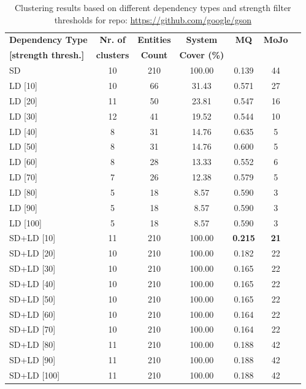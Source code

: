 \documentclass{ieeeaccess}
\begin{document}
\begin{table}
\caption{Clustering results based on different dependency types and strength filter thresholds for repo: \href{https://github.com/google/gson}{https://github.com/google/gson}}
\label{tab:clustering_results_gson}
\centering
\setlength{\tabcolsep}{3pt}
\begin{tabular}{|l|c|c|c|c|c|c|}
\hline
\textbf{Dependency Type} & \textbf{Nr. of} & \textbf{Entities} & \textbf{System} & \textbf{MQ} & \textbf{MoJo} \\
\textbf{[strength thresh.]} & \textbf{clusters} & \textbf{Count} & \textbf{Cover (\%)} &  &  \\
\hline
SD & 10 & 210 & 100.00 & 0.139 & 44 \\
\hline
LD [10] & 10 & 66 & 31.43 & 0.571 & 27 \\
LD [20] & 11 & 50 & 23.81 & 0.547 & 16 \\
LD [30] & 12 & 41 & 19.52 & 0.544 & 10 \\
LD [40] & 8 & 31 & 14.76 & 0.635 & 5 \\
LD [50] & 8 & 31 & 14.76 & 0.600 & 5 \\
LD [60] & 8 & 28 & 13.33 & 0.552 & 6 \\
LD [70] & 7 & 26 & 12.38 & 0.579 & 5 \\
LD [80] & 5 & 18 & 8.57 & 0.590 & 3 \\
LD [90] & 5 & 18 & 8.57 & 0.590 & 3 \\
LD [100] & 5 & 18 & 8.57 & 0.590 & 3 \\
\hline
SD+LD [10] & 11 & 210 & 100.00 & \cellcolor[HTML]{C0C0C0}\textbf{0.215} & \cellcolor[HTML]{C0C0C0}\textbf{21} \\
SD+LD [20] & 10 & 210 & 100.00 & 0.182 & 22 \\
SD+LD [30] & 10 & 210 & 100.00 & 0.165 & 22 \\
SD+LD [40] & 10 & 210 & 100.00 & 0.165 & 22 \\
SD+LD [50] & 10 & 210 & 100.00 & 0.165 & 22 \\
SD+LD [60] & 10 & 210 & 100.00 & 0.164 & 22 \\
SD+LD [70] & 10 & 210 & 100.00 & 0.164 & 22 \\
SD+LD [80] & 11 & 210 & 100.00 & 0.188 & 42 \\
SD+LD [90] & 11 & 210 & 100.00 & 0.188 & 42 \\
SD+LD [100] & 11 & 210 & 100.00 & 0.188 & 42 \\
\hline
\end{tabular}
\end{table}
\end{document}
